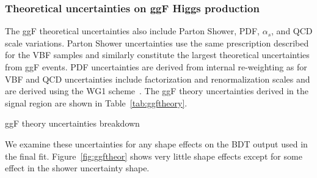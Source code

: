 \subsubsection{Theoretical uncertainties on ggF Higgs production}
The ggF theoretical uncertainties also include Parton Shower, PDF, $\alpha_s$, and QCD scale variations. Parton Shower uncertainties use the same prescription described for the VBF samples and similarly constitute the largest theoretical uncertainties from ggF events. PDF uncertainties are derived from internal re-weighting as for VBF and QCD uncertainties include factorization and renormalization scales and are derived using the WG1 scheme~\cite{WG1}. The ggF theory uncertainties derived in the signal region are shown in Table~\ref{tab:ggftheory}.
\begin{table}[h!]
\centering
\scalebox{1.0}{

}
\caption{ggF theory uncertainties breakdown}
\label{tab:ggftheory}
\end{table}

We examine these uncertainties for any shape effects on the BDT output used in the final fit. Figure~\ref{fig:ggftheor} shows very little shape effects except for some effect in the shower uncertainty shape. 

